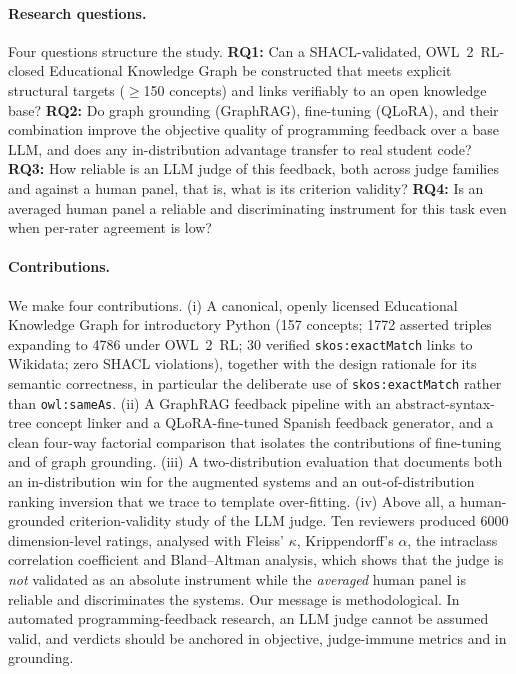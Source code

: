 \documentclass[sageh]{sagej}
\begin{document}
\paragraph{Research questions.} Four questions structure the study. \textbf{RQ1:} Can a SHACL-validated, OWL~2~RL-closed Educational Knowledge Graph be constructed that meets explicit structural targets ($\geq$150 concepts) and links verifiably to an open knowledge base? \textbf{RQ2:} Do graph grounding (GraphRAG), fine-tuning (QLoRA), and their combination improve the objective quality of programming feedback over a base LLM, and does any in-distribution advantage transfer to real student code? \textbf{RQ3:} How reliable is an LLM judge of this feedback, both across judge families and against a human panel, that is, what is its criterion validity? \textbf{RQ4:} Is an averaged human panel a reliable and discriminating instrument for this task even when per-rater agreement is low?

\paragraph{Contributions.} We make four contributions. (i) A canonical, openly licensed Educational Knowledge Graph for introductory Python (157 concepts; 1772 asserted triples expanding to 4786 under OWL~2~RL; 30 verified \texttt{skos:exactMatch} links to Wikidata; zero SHACL violations), together with the design rationale for its semantic correctness, in particular the deliberate use of \texttt{skos:exactMatch} rather than \texttt{owl:sameAs}. (ii) A GraphRAG feedback pipeline with an abstract-syntax-tree concept linker and a QLoRA-fine-tuned Spanish feedback generator, and a clean four-way factorial comparison that isolates the contributions of fine-tuning and of graph grounding. (iii) A two-distribution evaluation that documents both an in-distribution win for the augmented systems and an out-of-distribution ranking inversion that we trace to template over-fitting. (iv) Above all, a human-grounded criterion-validity study of the LLM judge. Ten reviewers produced 6000 dimension-level ratings, analysed with Fleiss' $\kappa$, Krippendorff's $\alpha$, the intraclass correlation coefficient and Bland--Altman analysis, which shows that the judge is \emph{not} validated as an absolute instrument while the \emph{averaged} human panel is reliable and discriminates the systems. Our message is methodological. In automated programming-feedback research, an LLM judge cannot be assumed valid, and verdicts should be anchored in objective, judge-immune metrics and in grounding.
\end{document}
